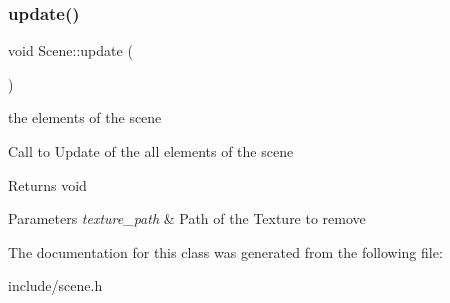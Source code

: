 \subsubsection{\texorpdfstring{update()}{update()}}
{\footnotesize\ttfamily void Scene\+::update (\begin{DoxyParamCaption}{ }\end{DoxyParamCaption})}

the elements of the scene

Call to Update of the all elements of the scene

\begin{DoxyReturn}{Returns}
void 
\end{DoxyReturn}

\begin{DoxyParams}{Parameters}
{\em texture\+\_\+path} & Path of the Texture to remove \\
\hline
\end{DoxyParams}


The documentation for this class was generated from the following file\+:\begin{DoxyCompactItemize}
\item 
include/scene.\+h\end{DoxyCompactItemize}

